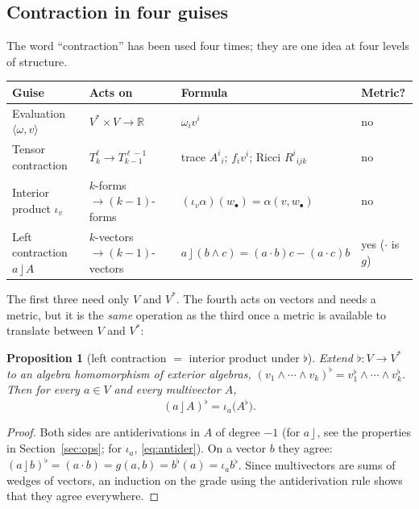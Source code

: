 \documentclass[11pt,a4paper]{article}
\renewcommand{\arraystretch}{1.25}
\newcounter{thm}[section]
\numberwithin{equation}{section}
\theoremstyle{definition}
\theoremstyle{plain}
\newtheorem{proposition}[thm]{Proposition}
\newcommand{\R}{\mathbb{R}}
\newcommand{\lc}{\mathbin{\rfloor}}
\begin{document}
\subsection{Contraction in four guises}\label{sec:contr4}

The word ``contraction'' has been used four times; they are one idea at four levels of structure.

\begin{center}
\small
\renewcommand{\arraystretch}{1.35}
\begin{tabular}{@{}p{3.4cm}p{3.5cm}p{4.2cm}p{2.2cm}@{}}
\toprule
\textbf{Guise} & \textbf{Acts on} & \textbf{Formula} & \textbf{Metric?}\\
\midrule
Evaluation $\langle\omega,v\rangle$ & $V^*\times V\to\R$ & $\omega_iv^i$ & no\\
Tensor contraction & $T^{\ell}_{k}\to T^{\ell-1}_{k-1}$ & trace $A^i{}_i$; $f_iv^i$; Ricci $R^i{}_{ijk}$ & no\\
Interior product $\iota_v$ & $k$-forms $\to(k-1)$-forms & $(\iota_v\alpha)(w_\bullet)=\alpha(v,w_\bullet)$ & no\\
Left contraction $a\lc A$ & $k$-vectors $\to(k-1)$-vectors & $a\lc(b\wedge c)=(a\!\cdot\! b)c-(a\!\cdot\! c)b$ & yes ($\cdot$ is $g$)\\
\bottomrule
\end{tabular}
\end{center}

The first three need only $V$ and $V^*$. The fourth acts on vectors and needs a metric, but it is the \emph{same} operation as the third once a
metric is available to translate between $V$ and $V^*$:

\begin{proposition}[left contraction $=$ interior product under $\flat$]\label{prop:lcisiota}
Extend $\flat:V\to V^*$ to an algebra homomorphism of exterior algebras, $(v_1\wedge\cdots\wedge v_k)^\flat=v_1^\flat\wedge\cdots\wedge v_k^\flat$. Then for every $a\in V$
and every multivector $A$,
\[
(a\lc A)^\flat=\iota_a\bigl(A^\flat\bigr).
\]
\end{proposition}
\begin{proof}
Both sides are antiderivations in $A$ of degree $-1$ (for $a\lc$, see the properties in Section~\ref{sec:ops}; for $\iota_a$, \eqref{eq:antider}). On a vector $b$ they agree:
$(a\lc b)^\flat=(a\cdot b)=g(a,b)=b^\flat(a)=\iota_a b^\flat$. Since multivectors are sums of wedges of vectors, an induction on the grade using the antiderivation rule shows that they agree everywhere.
\end{proof}
\end{document}
